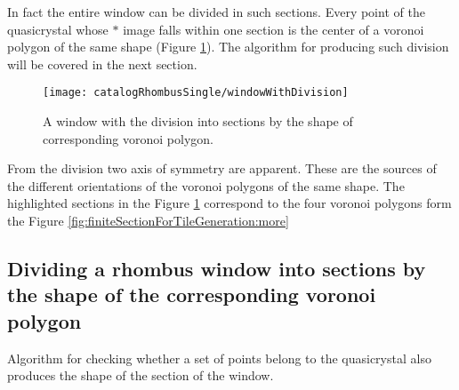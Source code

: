 \documentclass[text.tex]{subfiles}
\begin{document}
In fact the entire window can be divided in such sections. Every point of the quasicrystal whose $\ast$ image falls within one section is the center of a voronoi polygon of the same shape (Figure \ref{fig:windowWithDivision}). The algorithm for producing such division will be covered in the next section.  

\begin{figure}[h]
\centering
\texttt{[image: catalogRhombusSingle/windowWithDivision]}
\caption{A window with the division into sections by the shape of corresponding voronoi polygon.}
\label{fig:windowWithDivision}
\end{figure}

From the division two axis of symmetry are apparent. These are the sources of the different orientations of the voronoi polygons of the same shape. The highlighted sections in the Figure \ref{fig:windowWithDivision} correspond to the four voronoi polygons form the Figure \ref{fig:finiteSectionForTileGeneration:more}

\subsection{Dividing a rhombus window into sections by the shape of the corresponding voronoi polygon}
Algorithm for checking whether a set of points belong to the quasicrystal also produces the shape of the section of the window. 
\end{document}
